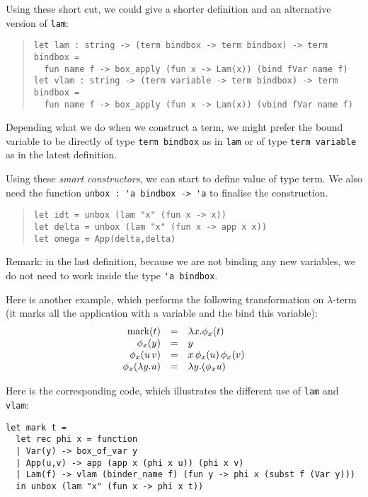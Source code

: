 \documentclass[11pt]{article}
\begin{document}
Using these short cut, we could give a shorter definition and an
alternative version of \verb#lam#:

\begin{quote}
\begin{verbatim}
let lam : string -> (term bindbox -> term bindbox) -> term bindbox =
  fun name f -> box_apply (fun x -> Lam(x)) (bind fVar name f)
let vlam : string -> (term variable -> term bindbox) -> term bindbox =
  fun name f -> box_apply (fun x -> Lam(x)) (vbind fVar name f)
\end{verbatim}
\end{quote}

Depending what we do when we construct a term, we might prefer
the bound variable to be directly of type \verb#term bindbox# as in
\verb#lam# or of type \verb#term variable# as in the latest definition.

Using these \emph{smart constructors}, we can start to define value of
type term. We also need the function \verb#unbox : 'a bindbox -> 'a#
to finalise the construction.
\begin{quote}
\begin{verbatim}
let idt = unbox (lam "x" (fun x -> x))
let delta = unbox (lam "x" (fun x -> app x x))
let omega = App(delta,delta)
\end{verbatim}
\end{quote}

Remark: in the last definition, because we are not binding any new
variables, we do not need to work inside the type \verb#'a bindbox#.

Here is another example, which performs the following transformation on
$\lambda$-term (it marks all the application with a variable and the
bind this variable):
$$
\begin{array}{rcl}
\hbox{mark}(t) &=& \lambda x.\phi_x(t) \cr
\phi_x(y) &=& y \cr
\phi_x(u\,v) &=& x\,\phi_x(u)\,\phi_x(v) \cr
\phi_x(\lambda y.u) &=& \lambda y.(\phi_x u)
\end{array}
$$

Here is the corresponding code, which illustrates the different use
of \verb#lam# and \verb#vlam#:

\begin{verbatim}
let mark t =
  let rec phi x = function
  | Var(y) -> box_of_var y
  | App(u,v) -> app (app x (phi x u)) (phi x v)
  | Lam(f) -> vlam (binder_name f) (fun y -> phi x (subst f (Var y)))
  in unbox (lam "x" (fun x -> phi x t))
\end{verbatim}
\end{document}
